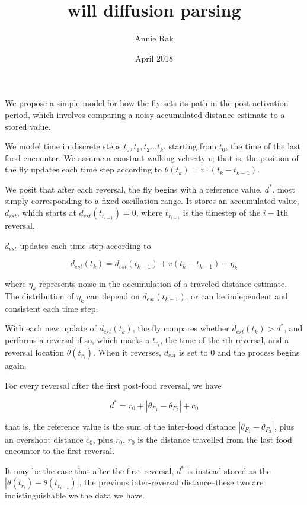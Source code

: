 

\title{will diffusion parsing}
\author{Annie Rak}
\date{April 2018}




We propose a simple model for how the fly sets its path in the post-activation period, which involves comparing a noisy accumulated distance estimate to a stored value.

We model time in discrete steps $t_0,t_1,t_2 \dots t_k$, starting from $t_0$, the time of the last food encounter. We assume a constant walking velocity $v$; that is, the position of the fly updates each time step according to $\theta(t_k) = v\cdot(t_k-t_{k-1})$. 


We posit that after each reversal, the fly begins with a reference value, $d^*$, most simply corresponding to a fixed oscillation range. It stores an accumulated value, $d_{est}$, which starts at $d_{est}(t_{r_{i-1}})=0$, 
where $t_{r_{i-1}}$ is the timestep of the $i-1$th reversal. 



$d_{est}$ updates each time step according to

$$
d_{est}(t_k) = d_{est}(t_{k-1}) + v(t_k-t_{k-1}) + \eta_k$$  

where $\eta_k$ represents noise in the accumulation of a traveled distance estimate. The distribution of $\eta_k$ can depend on $d_{est}(t_{k-1})$, or can be independent and consistent each time step.

With each new update of $d_{est}(t_k)$, the fly compares whether $d_{est}(t_k)>d^*$, and performs a reversal if so, which marks a $t_{r_i}$, the time of the $i$th reversal, and a reversal location $\theta(t_{r_i})$. When it reverses, $d_{est}$ is set to 0 and the process begins again.

For every reversal after the first post-food reversal, we have 

$$d^* = r_0 + |\theta_{F_1}-\theta_{F_2}| + c_0$$

that is, the reference value is the sum of the inter-food distance $|\theta_{F_1}-\theta_{F_2}|$, plus an overshoot distance $c_0$, plus $r_0$. 
$r_0$ is the distance travelled from the last food encounter to the first reversal.  

It may be the case that after the first reversal, $d^*$ is instead stored as the $|\theta(t_{r_i}) - \theta(t_{r_{i-1}})|$, the previous inter-reversal distance--these two are indistinguishable we the data we have.

